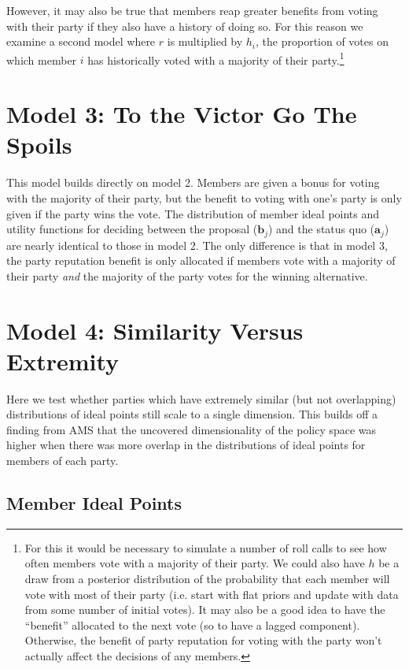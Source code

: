 \documentclass[12pt]{article}
\begin{document}
However, it may also be true that members reap greater benefits from voting with their party if they also have a history of doing so. For this reason we examine a second model where $r$ is multiplied by $h_i$, the proportion of votes on which member $i$ has historically voted with a majority of their party.\footnote{For this it would be necessary to simulate a number of roll calls to see how often members vote with a majority of their party. We could also have $h$ be a draw from a posterior distribution of the probability that each member will vote with most of their party (i.e. start with flat priors and update with data from some number of initial votes). It may also be a good idea to have the ``benefit'' allocated to the next vote (so to have a lagged component). Otherwise, the benefit of party reputation for voting with the party won't actually affect the decisions of any members.}

\section*{Model 3: To the Victor Go The Spoils}

This model builds directly on model 2. Members are given a bonus for voting with the majority of their party, but the benefit to voting with one's party is only given if the party wins the vote. The distribution of member ideal points and utility functions for deciding between the proposal ($\boldsymbol{b}_j$) and the status quo ($\boldsymbol{a}_j$) are nearly identical to those in model 2. The only difference is that in model 3, the party reputation benefit is only allocated if members vote with a majority of their party \emph{and} the majority of the party votes for the winning alternative.

\section*{Model 4: Similarity Versus Extremity}

Here we test whether parties which have extremely similar (but not overlapping) distributions of ideal points still scale to a single dimension. This builds off a finding from AMS that the uncovered dimensionality of the policy space was higher when there was more overlap in the distributions of ideal points for members of each party.

\subsection*{Member Ideal Points}
\end{document}
